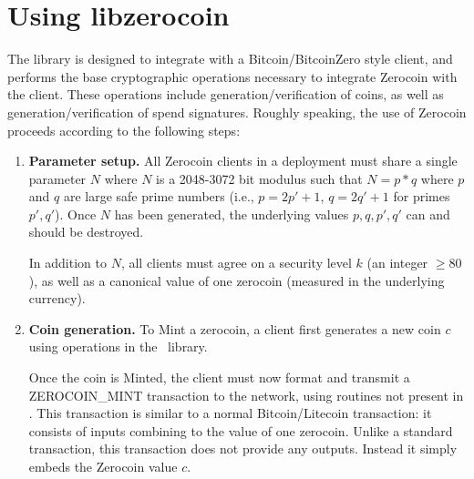 \section{Using libzerocoin}

The \libzerocoin library is designed to integrate with a Bitcoin/BitcoinZero style client, and performs the base cryptographic operations necessary to integrate Zerocoin with the client. These operations include generation/verification of coins, as well as generation/verification of spend signatures. Roughly speaking, the use of Zerocoin proceeds according to the following steps:

\begin{enumerate}
\item {\bf Parameter setup.} All Zerocoin clients in a deployment must share a single parameter $N$ where $N$ is a 2048-3072 bit modulus such that $N = p*q$ where $p$ and $q$ are large safe prime numbers (i.e., $p = 2p'+1$, $q = 2q'+1$ for primes $p', q'$). Once $N$ has been generated, the underlying values $p, q, p', q'$ can and should be destroyed.

In addition to $N$, all clients must agree on a security level $k$ (an integer $\ge 80$), as well as a canonical value of one zerocoin (measured in the underlying currency).

\item {\bf Coin generation.} To Mint a zerocoin, a client first generates a new coin $c$ using operations in the \libzerocoin~library.

Once the coin is Minted, the client must now format and transmit a \textsf{ZEROCOIN\_MINT} transaction to the network, using routines not present in \libzerocoin. This transaction is similar to a normal Bitcoin/Litecoin transaction: it consists of inputs combining to the value of one zerocoin. Unlike a standard transaction, this transaction does not provide any outputs. Instead it simply embeds the Zerocoin value $c$.

\end{enumerate}
